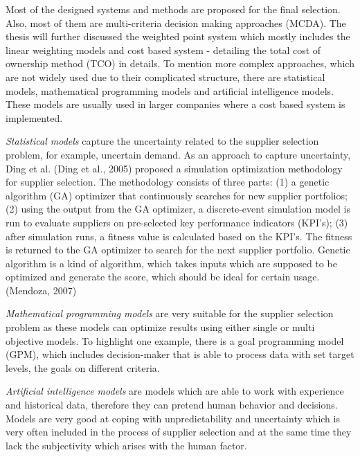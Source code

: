 \documentclass[oneside,12pt]{article}%
\begin{document}
Most of the designed systems and methods are proposed for the final selection. Also, most of them are multi-criteria decision making approaches (MCDA). The thesis will further discussed the weighted point system which mostly includes the linear weighting models and cost based system - detailing the total cost of ownership method (TCO) in details. To mention more complex approaches, which are not widely used due to their complicated structure, there are statistical models, mathematical programming models and artificial intelligence models. These models are usually used in larger companies where a cost based system is implemented.\par
\emph{Statistical models} capture the uncertainty related to the supplier selection problem, for example, uncertain demand. As an approach to capture uncertainty, Ding et al. (Ding et al., 2005) proposed a simulation optimization methodology for supplier selection. The methodology consists of three parts: (1) a genetic algorithm (GA) optimizer that continuously searches for new supplier portfolios; (2) using the output from the GA optimizer, a discrete-event simulation model is run to evaluate suppliers on pre-selected key performance indicators (KPI’s); (3) after simulation runs, a fitness value is calculated based on the KPI’s. The fitness is returned to the GA optimizer to search for the next supplier portfolio. Genetic algorithm is a kind of algorithm, which takes inputs which are supposed to be optimized and generate the score, which should be ideal for certain usage. (Mendoza, 2007)\par
\emph{Mathematical programming models} are very suitable for the supplier selection problem as these models can optimize results using either single or multi objective models. To highlight one example, there is a goal programming model (GPM), which includes decision-maker that is able to process data with set target levels, the goals on different criteria. \par
\emph{Artificial intelligence models} are models which are able to work with experience and historical data, therefore they can pretend human behavior and decisions. Models are very good at coping with unpredictability and uncertainty which is very often included in the process of supplier selection and at the same time they lack the subjectivity which arises with the human factor.


\end{document}
